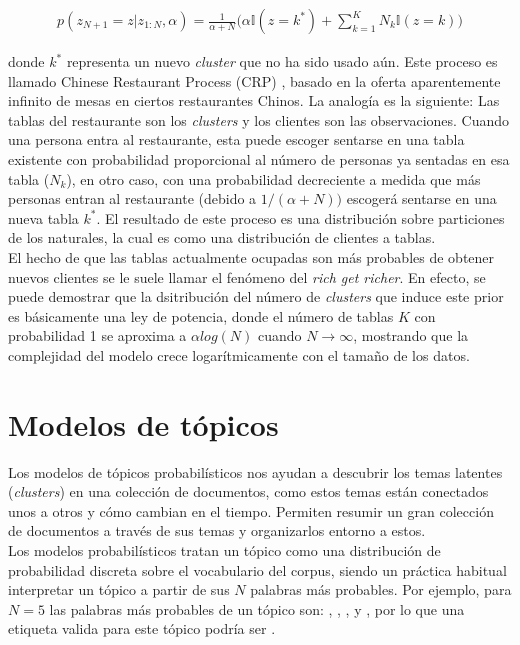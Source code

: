 \documentclass[letterpaper,12pt,oneside]{book} %
\begin{document}
\begin{align}
p(z_{N+1}=z|z_{1:N}, \alpha) = \frac{1}{\alpha+N}\bigg(\alpha\mathbb{I}(z=k^{*})+\sum_{k=1}^{K}N_{k}\mathbb{I}(z=k)\bigg)
\end{align}

donde $k^{*}$ representa un nuevo \textit{cluster} que no ha sido usado aún. Este proceso es llamado Chinese Restaurant Process (CRP) \citep{aldous1985exchangeability}, basado en la oferta aparentemente infinito de mesas en ciertos restaurantes Chinos. La analogía es la siguiente: Las tablas del restaurante son los \textit{clusters}  y los clientes son las observaciones. Cuando una persona entra al restaurante, esta puede escoger sentarse en una tabla existente con probabilidad proporcional al número de personas ya sentadas en esa tabla ($N_{k}$), en otro caso, con una probabilidad decreciente a medida que más personas entran al restaurante (debido a $1/(\alpha +N))$ escogerá sentarse en una nueva tabla $k^{*}$. El resultado de este proceso es una distribución sobre particiones de los naturales, la cual es como una distribución de clientes a tablas.\\

El hecho de que las tablas actualmente ocupadas son más probables de obtener nuevos clientes se le suele llamar el fenómeno del \textit{rich get richer}. En efecto, se puede demostrar que la dsitribución del número de \textit{clusters} que induce este prior es básicamente una ley de potencia, donde el número de tablas $K$ con probabilidad 1 se aproxima a $\alpha log(N)$ cuando $N\rightarrow \infty$, mostrando que la complejidad del modelo crece logarítmicamente con el tamaño de los datos.

\section{Modelos de tópicos}
\label{sec:topic_models}
Los modelos de tópicos probabilísticos nos ayudan a descubrir los temas latentes (\textit{clusters}) en una colección de documentos, como estos temas están conectados unos a otros y cómo cambian en el tiempo. Permiten resumir un gran colección de documentos a través de sus temas y organizarlos entorno a estos.\\

Los modelos probabilísticos tratan un tópico como una distribución de probabilidad discreta sobre el vocabulario del corpus, siendo un práctica habitual interpretar un tópico a partir de sus $N$ palabras más probables. Por ejemplo, para $N=5$ las palabras más probables de un tópico son: , , ,  y , por lo que una etiqueta valida para este tópico podría ser .\\ 
\end{document}
